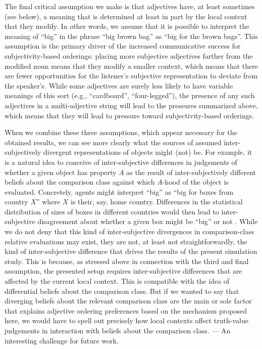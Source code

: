\documentclass[10pt,a4paper]{article}
\begin{document}
The final critical assumption we make is that adjectives have, at least sometimes (see below), a meaning that is determined at least in part by the local context that they modify. In other words, we assume that it is possible to interpret the meaning of ``big''  in the phrase ``big brown bag'' as ``big for the brown bags''. This assumption is the primary driver of the increased communicative success for subjectivity-based orderings: placing more subjective adjectives farther from the modified noun means that they modify a smaller context, which means that there are fewer opportunities for the listener's subjective representation to deviate from the speaker's. While some adjectives are surely less likely to have variable meanings of this sort (e.g., ``cardboard'', ``four-legged''), the presence of any such adjectives in a multi-adjective string will lead to the pressures summarized above, which means that they will lead to pressure toward subjectivity-based orderings.

When we combine these three assumptions, which appear necessary for the obtained results, we can see more clearly what the sources of assumed inter-subjectively divergent representations of objects might (not) be. For example, it is a natural idea to conceive of inter-subjective differences in judgements of whether a given object has property $A$ as the result of inter-subjectively different beliefs about the comparison class against which $A$-hood of the object is evaluated. Concretely, agents might interpret ``big'' as ``big for boxes from country $X$'' where $X$ is their, say, home country. Differences in the statistical distribution of sizes of boxes in different countries would then lead to inter-subjective disagreement about whether a given box might be ``big'' or not \cite{QingFranke2014:Gradable-Adject,lassitergoodman2015}. While we do not deny that this kind of inter-subjective divergences in comparison-class relative evaluations may exist, they are not, at least not straightforwardly, the kind of inter-subjective difference that drives the results of the present simulation study. This is because, as stressed above in connection with the third and final assumption, the presented setup requires inter-subjective differences that are affected by the current local context. This is compatible with the idea of differential beliefs about the comparison class. But if we wanted to say that diverging beliefs about the relevant comparison class are the main or sole factor that explains adjective ordering preferences based on the mechanism proposed here, we would have to spell out precisely how local contexts affect truth-value judgements in interaction with beliefs about the comparison class. --- An interesting challenge for future work.
\end{document}
